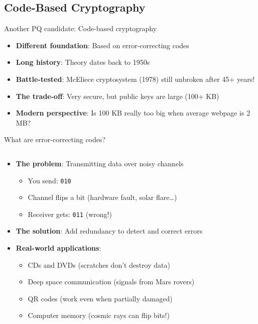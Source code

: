 \documentclass[aspectratio=169, lualatex, handout]{beamer}
\begin{document}
\subsection{Code-Based Cryptography}

\begin{frame}{Another PQ candidate: Code-based cryptography}
	\begin{itemize}
		\item \textbf{Different foundation}: Based on error-correcting codes
		\item \textbf{Long history}: Theory dates back to 1950s
		\item \textbf{Battle-tested}: McEliece cryptosystem (1978) still unbroken after 45+ years!
		\item \textbf{The trade-off}: Very secure, but public keys are large (100+ KB)
		\item \textbf{Modern perspective}: Is 100 KB really too big when average webpage is 2 MB?
	\end{itemize}
\end{frame}

\begin{frame}{What are error-correcting codes?}
	\begin{columns}[c]
		\begin{column}{0.7\textwidth}
			\begin{itemize}
				\item \textbf{The problem}: Transmitting data over noisy channels
				      \begin{itemize}
					      \item You send: \texttt{010}
					      \item Channel flips a bit (hardware fault, solar flare\ldots)
					      \item Receiver gets: \texttt{011} (wrong!)
				      \end{itemize}
				\item \textbf{The solution}: Add redundancy to detect and correct errors
				\item \textbf{Real-world applications}:
				      \begin{itemize}
					      \item CDs and DVDs (scratches don't destroy data)
					      \item Deep space communication (signals from Mars rovers)
					      \item QR codes (work even when partially damaged)
					      \item Computer memory (cosmic rays can flip bits!)
				      \end{itemize}
			\end{itemize}
		\end{column}
		\begin{column}{0.3\textwidth}
		\end{column}
	\end{columns}

\end{frame}
\end{document}
